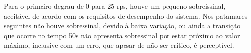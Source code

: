 Para o primeiro degrau de 0 para 25 rps, houve um pequeno sobreissinal, 
aceitável de acordo com os requisitos de desempenho do sistema. 
Nos patamares seguintes não houve sobressinal, devido à baixa variação, 
ou ainda a transição que ocorre no tempo 50s não apresenta sobressinal 
por estar próximo ao valor máximo, inclusive com um erro, que apesar 
de não ser crítico, é perceptível.





